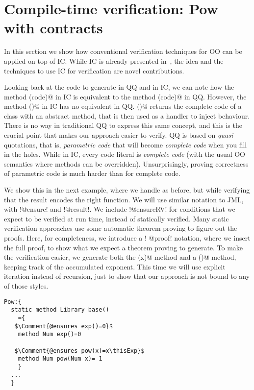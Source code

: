 \section{Compile-time verification: Pow with contracts}
In this section we show how conventional verification techniques for OO can be applied on top of IC.
While IC is already presented in~\cite{servetto2014meta},
the idea and the techniques to use IC for verification are novel contributions.

Looking back at the code to generate \Q@pow@ in QQ and in IC,
we can
note how the method \Q@inductive(code)@ in IC is equivalent to the method
\Q@inductive(code)@ in QQ.
However,
the method \Q@inductive()@ in IC has no equivalent in QQ.
\Q@inductive()@ returns the complete code of a class with an abstract method,
that is then used as a handler to inject behaviour.
There is no way in traditional QQ to express this same concept,
and this is the crucial point that makes our approach easier to verify.
QQ is based on \emph{quasi} quotations, that is, \emph{parametric code} that
will become \emph{complete code} when you fill in the holes.
While in IC, every code literal is \emph{complete code} (with
the usual OO semantics where methods can be overridden).
Unsurprisingly, proving correctness of parametric code is much harder
than for complete code.

We show this in the next example, where we handle \Q@pow@ as before, but while verifying that the
result encodes the right \Q@pow@ function. We will use similar notation to JML, with \Q!@ensure! and \Q!@result!.
We include \Q!@ensureRV! for conditions that we expect to be verified at run time, instead of statically verified.
Many static verification approaches use some automatic theorem proving to figure out the proofs. Here, for completeness, we introduce a 
\Q! @proof! notation, where we insert the full proof, to show what we expect a theorem proving to generate.
To make the verification easier, we generate both the \Q@pow(x)@ method
and a \Q@exp()@ method, keeping track of the accumulated exponent.
This time we will use explicit iteration instead of recursion, just to show that our approach is not bound to any of those styles.
\newcommand\thisExp{\ensuremath{{}^{\textbf{this.exp()}}}}
\newcommand\thisSuperExp{\ensuremath{{}^{\textbf{this.superExp()}}}}
\newcommand\oneThisSuperExp{\ensuremath{{}^{\textbf{1+this.superExp()}}}}
\newcommand\powerY{\ensuremath{{}^{\textbf{y}}}}

\begin{lstlisting}
Pow:{
  static method Library base()
    ={
   $\Comment{@ensures exp()=0}$
    method Num exp()=0 
    
   $\Comment{@ensures pow(x)=x\thisExp}$
    method Num pow(Num x)= 1 
    }
  ...
  }
\end{lstlisting}


